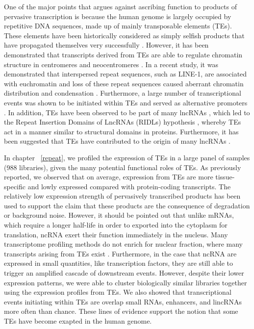 One of the major points that argues against ascribing function to products of pervasive transcription is because the human genome is largely occupied by repetitive DNA sequences, made up of mainly transposable elements (TEs). These elements have been historically considered as simply selfish products that have propagated themselves very successfully \citep{doolittle1980selfish,orgel1980selfish}. However, it has been demonstrated that transcripts derived from TEs are able to regulate chromatin structure in centromeres and neocentromeres \citep{pmid19180186}. In a recent study, it was demonstrated that interspersed repeat sequences, such as LINE-1, are associated with euchromatin and loss of these repeat sequences caused aberrant chromatin distribution and condensation \citep{pmid24581492}. Furthermore, a large number of transcriptional events was shown to be initiated within TEs and served as alternative promoters \citep{pmid19377475}. In addition, TEs have been observed to be part of many lncRNAs \citep{pmid23181609}, which led to the Repeat Insertion Domains of LncRNAs (RIDLs) hypothesis \citep{pmid24850885}, whereby TEs act in a manner similar to structural domains in proteins. Furthermore, it has been suggested that TEs have contributed to the origin of many lncRNAs \citep{pmid23637635,pmid25218058}.

In chapter ~\ref{repeat}, we profiled the expression of TEs in a large panel of samples (988 libraries), given the many potential functional roles of TEs. As previously reported, we observed that on average, expression from TEs are more tissue-specific and lowly expressed compared with protein-coding transcripts. The relatively low expression strength of pervasively transcribed products has been used to support the claim that these products are the consequence of degradation or background noise. However, it should be pointed out that unlike mRNAs, which require a longer half-life in order to exported into the cytoplasm for translation, ncRNA exert their function immediately in the nucleus. Many transcriptome profiling methods do not enrich for nuclear fraction, where many transcripts arising from TEs exist \citep{pmid24777452}. Furthermore, in the case that ncRNA are expressed in small quantities, like transcription factors, they are still able to trigger an amplified cascade of downstream events. However, despite their lower expression patterns, we were able to cluster biologically similar libraries together using the expression profiles from TEs. We also showed that transcriptional events initiating within TEs are overlap small RNAs, enhancers, and lincRNAs more often than chance. These lines of evidence support the notion that some TEs have become exapted in the human genome.
